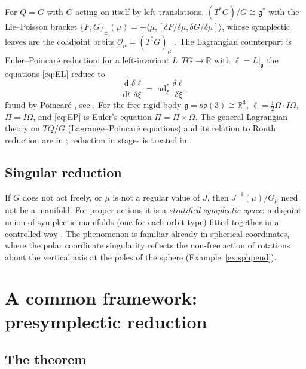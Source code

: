 \documentclass[11pt,a4paper]{article}
\numberwithin{equation}{section}
\theoremstyle{plain}
\theoremstyle{definition}
\theoremstyle{remark}
\newcommand{\R}{\mathbb{R}}
\newcommand{\frakg}{\mathfrak{g}}
\newcommand{\ad}{\operatorname{ad}}
\newcommand{\pb}[2]{\{#1,#2\}}
\newcommand{\pair}[2]{\langle #1,#2\rangle}
\newcommand{\dd}{\mathrm{d}}
\begin{document}
For $Q=G$ with $G$ acting on itself by left translations, $(T^*G)/G\cong\frakg^*$ with the Lie--Poisson bracket $\pb FG_\pm(\mu)=\pm\pair\mu{[\delta F/\delta\mu,\delta G/\delta\mu]}$, whose symplectic leaves are the coadjoint orbits $\mathcal O_\mu=(T^*G)_\mu$ \cite{am1978,mr1999}. The Lagrangian counterpart is Euler--Poincar\'e reduction: for a left-invariant $L:TG\to\R$ with $\ell=L|_{\frakg}$ the equations \eqref{eq:EL} reduce to
\begin{equation}\label{eq:EP}
\frac{\dd}{\dd t}\frac{\delta\ell}{\delta\xi}=\ad^*_\xi\frac{\delta\ell}{\delta\xi},
\end{equation}
found by Poincar\'e \cite{poincare1901}, see \cite{hmr1998}. For the free rigid body $\frakg=\mathfrak{so}(3)\cong\R^3$, $\ell=\frac12\Omega\cdot I\Omega$, $\Pi=I\Omega$, and \eqref{eq:EP} is Euler's equation $\dot\Pi=\Pi\times\Omega$. The general Lagrangian theory on $TQ/G$ (Lagrange--Poincar\'e equations) and its relation to Routh reduction are in \cite{marsdenscheurle1993,mrs2000,cmr2001}; reduction in stages is treated in \cite{mmopr2007}.

\subsection{Singular reduction}\label{sec:singular}

If $G$ does not act freely, or $\mu$ is not a regular value of $J$, then $J^{-1}(\mu)/G_\mu$ need not be a manifold. For proper actions it is a \emph{stratified symplectic space}: a disjoint union of symplectic manifolds (one for each orbit type) fitted together in a controlled way \cite{sjamaarlerman1991,op2004}. The phenomenon is familiar already in spherical coordinates, where the polar coordinate singularity reflects the non-free action of rotations about the vertical axis at the poles of the sphere (Example~\ref{ex:sphpend}).

\section{A common framework: presymplectic reduction}\label{sec:unified}

\subsection{The theorem}
\end{document}
